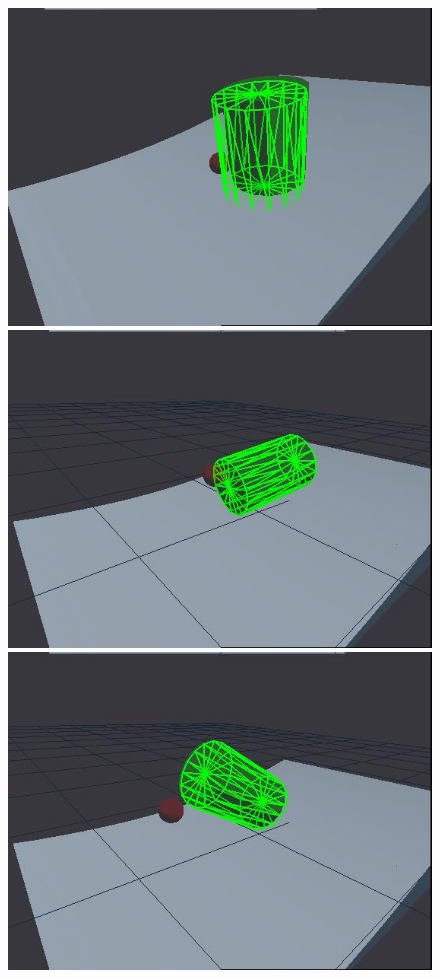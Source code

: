 \begin{figure}[htbp]
{}
\centerline{
\includegraphics[width=\imgwid]{./A00200}
\includegraphics[width=\imgwid]{./B00450}
\includegraphics[width=\imgwid]{./C01063}
}
\end{figure}
